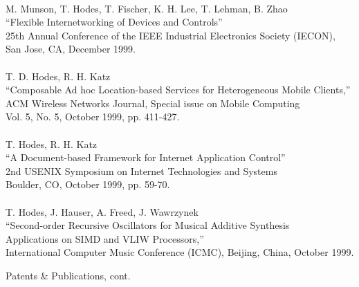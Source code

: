\begin{tabbing}
\smallskip \\[-3pt]
\>   M. Munson, T. Hodes, T. Fischer, K. H. Lee, T. Lehman, B. Zhao \\
\>\>      ``Flexible Internetworking of Devices and Controls'' \\
\>\>        25th Annual Conference of the IEEE Industrial Electronics Society (IECON),  \\
\>\>	    San Jose, CA, December 1999. \\

\smallskip \\[-3pt]
\>    T. D. Hodes, R. H. Katz \\
\>\>      ``Composable Ad hoc Location-based Services for Heterogeneous
             Mobile Clients,'' \\
\>\>       ACM Wireless Networks Journal, Special issue on Mobile Computing \\
\>\>       Vol. 5, No. 5, October 1999, pp. 411-427. \\
\smallskip \\[-3pt]
\>    T. Hodes, R. H. Katz \\
\>\>      ``A Document-based Framework for Internet Application Control'' \\
\>\>       2nd USENIX Symposium on Internet Technologies and Systems \\
\>\>       Boulder, CO, October 1999, pp. 59-70. \\
\smallskip \\[-3pt]
\>    T. Hodes, J. Hauser, A. Freed, J. Wawrzynek\\
\>\>      ``Second-order Recursive Oscillators for Musical Additive Synthesis \\
\>\>\>        Applications on SIMD and VLIW Processors,'' \\
\>\>       International Computer Music Conference (ICMC), Beijing, China, October 1999. \\

\end{tabbing}
\newpage
\begin{bf} \large
Patents \& Publications, cont.
\end{bf}
